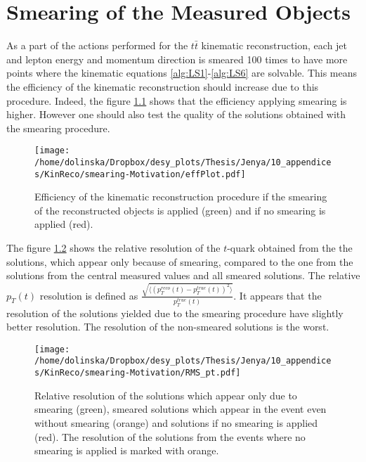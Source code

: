 \chapter{Smearing of the Measured Objects}\label{appendix:smear}

As a part of the actions performed for the $t\bar{t}$ kinematic reconstruction, each jet and lepton energy 
and momentum direction is smeared 100 times to have more points where the kinematic equations \ref{alg:LS1}-\ref{alg:LS6} 
are solvable. This means the efficiency of the kinematic reconstruction should increase due to this procedure.
Indeed, the figure \ref{fig:SmearEff} shows that the efficiency applying smearing is higher. However one should also test the
quality of the solutions obtained with the smearing procedure.

\begin{figure}[h]
  \centering
  \texttt{[image: /home/dolinska/Dropbox/desy\_plots/Thesis/Jenya/10\_appendices/KinReco/smearing-Motivation/effPlot.pdf]}
  \caption{Efficiency of the kinematic reconstruction procedure if the smearing of the reconstructed objects is applied (green)
  and if no smearing is applied (red).}
  \label{fig:SmearEff}
\end{figure}

The figure \ref{fig:RMSsmear} shows the relative resolution of the $t$-quark obtained from the the solutions, which appear 
only because of smearing, compared to the one from the
solutions from the central measured values and all smeared solutions.
The relative $p_{T}(t)$ resolution is defined as $\frac{\sqrt{\langle (p_{T}^{reco}(t) - p_{T}^{true}(t))^{2} \rangle}}{p^{true}_{T}(t)}$.
It appears that the resolution of the solutions
yielded due to the smearing procedure have slightly better resolution. The resolution of the non-smeared solutions is the worst.

\begin{figure}[t]
  \centering
  \texttt{[image: /home/dolinska/Dropbox/desy\_plots/Thesis/Jenya/10\_appendices/KinReco/smearing-Motivation/RMS\_pt.pdf]}
  \caption{Relative resolution of the solutions which appear only due to smearing (green), smeared solutions which appear in the 
  event even without smearing (orange) and solutions if no smearing is applied (red). The resolution of the solutions from the events
  where no smearing is applied is marked with orange.}
  \label{fig:RMSsmear}
\end{figure}

